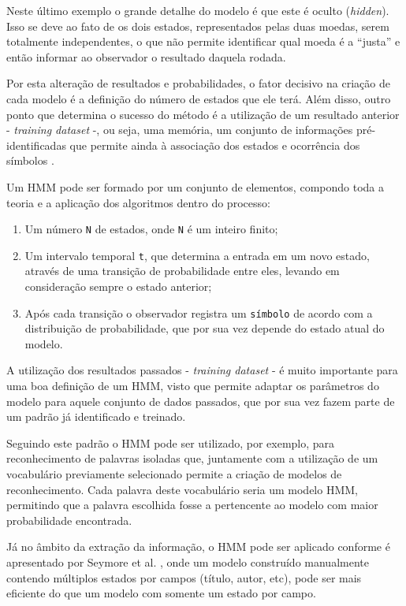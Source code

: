 Neste último exemplo o grande detalhe do modelo é que este é oculto (\textit{hidden}). Isso se deve ao fato de os dois estados, representados pelas duas moedas, serem totalmente independentes, o que não permite identificar qual moeda é a ``justa'' e então informar ao observador o resultado daquela rodada.

Por esta alteração de resultados e probabilidades, o fator decisivo na criação de cada modelo é a definição do número de estados que ele terá. Além disso, outro ponto que determina o sucesso do método é a utilização de um resultado anterior - \textit{training dataset} -, ou seja, uma memória, um conjunto de informações pré-identificadas que permite ainda à associação dos estados e ocorrência dos símbolos \cite{Rabiner-HMM}.

Um HMM pode ser formado por um conjunto de elementos, compondo toda a teoria e a aplicação dos algoritmos dentro do processo:

\begin{enumerate}
    \item Um número \texttt{N} de estados, onde \texttt{N} é um inteiro finito;
    \item Um intervalo temporal \texttt{t}, que determina a entrada em um novo estado, através de uma transição de probabilidade entre eles, levando em consideração sempre o estado anterior;
    \item Após cada transição o observador registra um \texttt{símbolo} de acordo com a distribuição de probabilidade, que por sua vez depende do estado atual do modelo.
\end{enumerate}

A utilização dos resultados passados - \textit{training dataset} - é muito importante para uma boa definição de um HMM, visto que permite adaptar os parâmetros do modelo para aquele conjunto de dados passados, que por sua vez fazem parte de um padrão já identificado e treinado.

Seguindo este padrão o HMM pode ser utilizado, por exemplo, para reconhecimento de palavras isoladas que, juntamente com a utilização de um vocabulário previamente selecionado permite a criação de modelos de reconhecimento. Cada palavra deste vocabulário seria um modelo HMM, permitindo que a palavra escolhida fosse a pertencente ao modelo com maior probabilidade encontrada.

Já no âmbito da extração da informação, o HMM pode ser aplicado conforme é apresentado por Seymore et al. \cite{Seymore-HMM-IE}, onde um modelo construído manualmente contendo múltiplos estados por campos (título, autor, etc), pode ser mais eficiente do que um modelo com somente um estado por campo. 

